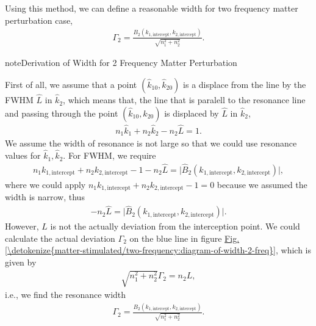 \documentclass[letterpaper,12pt,english]{sphinxmanual}
\begin{document}
Using this method, we can define a reasonable width for two frequency matter perturbation case,
\begin{equation*}
\begin{split}\Gamma_2 = \frac{B_2(k_{1,\mathrm{intercept}},k_{2,\mathrm{intercept}})}{\sqrt{n_1^2 + n_2^2}}.\end{split}
\end{equation*}
\begin{sphinxadmonition}{note}{Derivation of Width for 2 Frequency Matter Perturbation}

First of all, we assume that a point \((\hat k_{10},\hat k_{20})\) is a displace from the line by the FWHM \(\hat L\) in \(\hat k_2\), which means that, the line that is paralell to the resonance line and passing through the point \((\hat k_{10},\hat k_{20})\) is displaced by \(\hat L\) in \(\hat k_2\),
\begin{equation*}
\begin{split}n_1 \hat k_1 + n_2 \hat k_2 - n_2 \hat L = 1.\end{split}
\end{equation*}
We assume the width of resonance is not large so that we could use resonance values for \(\hat k_1, \hat k_2\). For FWHM, we require
\begin{equation*}
\begin{split}n_1 k_{1,\mathrm{intercept}} + n_2 k_{2,\mathrm{intercept}} -1  - n_2 \hat L = \lvert \hat B_2(k_{1,\mathrm{intercept}},k_{2,\mathrm{intercept}}) \rvert,\end{split}
\end{equation*}
where we could apply \(n_1 k_{1,\mathrm{intercept}} + n_2 k_{2,\mathrm{intercept}} -1 = 0\) because we assumed the width is narrow, thus
\begin{equation*}
\begin{split}- n_2 \hat L = \lvert \hat B_2(k_{1,\mathrm{intercept}},k_{2,\mathrm{intercept}}) \rvert.\end{split}
\end{equation*}
However, \(L\) is not the actually deviation from the interception point. We could calculate the actual deviation \(\Gamma_2\) on the blue line in figure \hyperref[\detokenize{matter-stimulated/two-frequency:diagram-of-width-2-freq}]{Fig.\@ \ref{\detokenize{matter-stimulated/two-frequency:diagram-of-width-2-freq}}}, which is given by
\begin{equation*}
\begin{split}\sqrt{n_1^2 + n_2^2} \Gamma_2 = n_2 L,\end{split}
\end{equation*}
i.e., we find the resonance width
\begin{equation*}
\begin{split}\Gamma_2 =  \frac{B_2(k_{1,\mathrm{intercept}},k_{2,\mathrm{intercept}})}{\sqrt{n_1^2 + n_2^2}}.\end{split}
\end{equation*}\end{sphinxadmonition}
\end{document}
